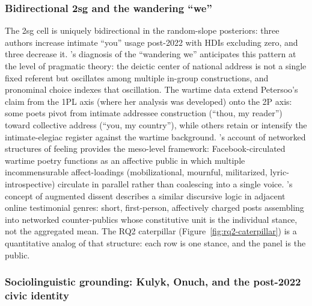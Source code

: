 \documentclass[12pt]{interact}
\theoremstyle{plain}%
\theoremstyle{definition}
\theoremstyle{remark}
\begin{document}
\subsubsection{Bidirectional 2sg and the wandering ``we''}

The 2sg cell is uniquely bidirectional in the random-slope posteriors: three authors increase intimate ``you'' usage post-2022 with HDIs excluding zero, and three decrease it. \citet{petersoo2007what}'s diagnosis of the ``wandering we'' anticipates this pattern at the level of pragmatic theory: the deictic center of national address is not a single fixed referent but oscillates among multiple in-group constructions, and pronominal choice indexes that oscillation. The wartime data extend Petersoo's claim from the 1PL axis (where her analysis was developed) onto the 2P axis: some poets pivot from intimate addressee construction (``thou, my reader'') toward collective address (``you, my country''), while others retain or intensify the intimate-elegiac register against the wartime background. \citet{papacharissi2015affective}'s account of networked structures of feeling provides the meso-level framework: Facebook-circulated wartime poetry functions as an affective public in which multiple incommensurable affect-loadings (mobilizational, mournful, militarized, lyric-introspective) circulate in parallel rather than coalescing into a single voice. \citet{lokot2018iamnotafraidtosayi, lokot2021beyond}'s concept of augmented dissent describes a similar discursive logic in adjacent online testimonial genres: short, first-person, affectively charged posts assembling into networked counter-publics whose constitutive unit is the individual stance, not the aggregated mean. The RQ2 caterpillar (Figure~\ref{fig:rq2-caterpillar}) is a quantitative analog of that structure: each row is one stance, and the panel is the public.

\subsubsection{Sociolinguistic grounding: Kulyk, Onuch, and the post-2022 civic identity}
\end{document}
